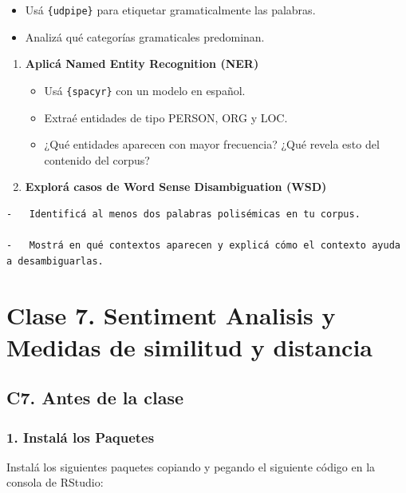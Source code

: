\documentclass[
  letterpaper,
  DIV=11,
  numbers=noendperiod]{scrreprt}
\begin{document}
\begin{itemize}
\item
  Usá \texttt{\{udpipe\}} para etiquetar gramaticalmente las palabras.
\item
  Analizá qué categorías gramaticales predominan.
\end{itemize}

\begin{enumerate}
\def\labelenumi{\arabic{enumi}.}
\setcounter{enumi}{2}
\item
  \textbf{Aplicá Named Entity Recognition (NER)}

  \begin{itemize}
  \item
    Usá \texttt{\{spacyr\}} con un modelo en español.
  \item
    Extraé entidades de tipo PERSON, ORG y LOC.
  \item
    ¿Qué entidades aparecen con mayor frecuencia? ¿Qué revela esto del
    contenido del corpus?
  \end{itemize}
\item
  \textbf{Explorá casos de Word Sense Disambiguation (WSD)}
\end{enumerate}

\begin{verbatim}
-   Identificá al menos dos palabras polisémicas en tu corpus.

-   Mostrá en qué contextos aparecen y explicá cómo el contexto ayuda a desambiguarlas.
\end{verbatim}

\part{Clase 7. Sentiment Analisis y Medidas de similitud y distancia}

\chapter{C7. Antes de la clase}\label{c7.-antes-de-la-clase}

\section{\texorpdfstring{\textbf{1. Instalá los
Paquetes}}{1. Instalá los Paquetes}}\label{instaluxe1-los-paquetes-3}

Instalá los siguientes paquetes copiando y pegando el siguiente código
en la consola de RStudio:
\end{document}
